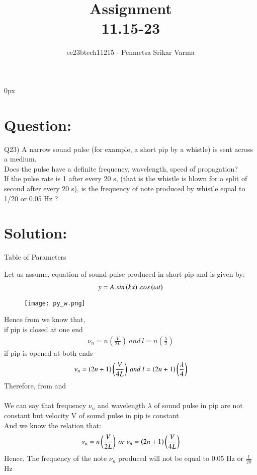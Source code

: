 \documentclass[beamer]{IEEEtran}
\theoremstyle{remark}
\begin{document}
\parindent 0px


\title{Assignment\\[1ex]11.15-23}
\author{ee23btech11215 - Penmetsa Srikar Varma$^{}$%
}
\maketitle
\newpage
\bigskip

\renewcommand{\thefigure}{\theenumi}
\renewcommand{\thetable}{\theenumi}
\section*{Question:}
Q23) A narrow sound pulse (for example, a short pip by a whistle) is sent across a
medium.\\  Does the pulse have a definite  frequency,  wavelength,  speed
of propagation?\\  If the pulse rate is 1 after every 20 s, (that is the whistle is
blown for a split of second after every 20 s), is the frequency of note produced
by whistle equal to 1/20 or 0.05 Hz ?
\section*{Solution:}
{\centering
Table of Parameters\\
}
\begin{table}[h]
    \centering
    
    \label{tab:t1}
\end{table}

 Let us assume, equation of sound pulse  produced in short pip and is given by:\\
\begin{align}
    \label{a1}
    y=A.sin\left(kx\right).cos\left(\omega t\right)
\end{align}
\begin{figure}[h]
    \centering
    \texttt{[image: py\_w.png]}
    \label{fig:enter-label}
\end{figure}

Hence from \brak{\ref{a1}} we know that,\\
if pip is closed at one end\\
\begin{align}
\label{a2}
\nu_n=n\left(\frac{V}{2L}\right)\ and\ l=n\left(\frac{\lambda}{2}\right)
\end{align}
if pip is opened at both ends\\
\begin{align}
\label{a3}
\nu_n=\brak{2n+1}\left(\frac{V}{4L}\right)\ and\ l=\brak{2n+1}\left(\frac{\lambda}{4}\right)
\end{align}
Therefore, from \brak{\ref{a2}} and \brak{\ref{a3}}\\\\
We can say that frequency $\nu_n$ and wavelength $\lambda$ of sound pulse in pip are not constant but velocity V of sound pulse in pip is constant\\

 And we know the relation that:
\begin{align}
    \label{a4}
    \nu_n=n\left(\frac{V}{2L}\right)\ or\ \nu_n=\brak{2n+1}\left(\frac{V}{4L}\right)
\end{align}
Hence, The frequency of the note $\nu_n$ produced will not be equal to 0.05 Hz or $\frac{1}{20}$ Hz 
\end{document}
